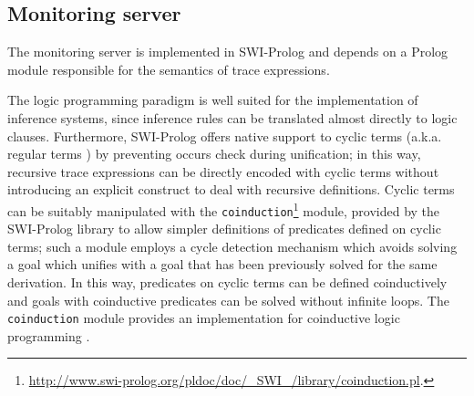 

\subsection*{Monitoring server}

The monitoring server is implemented in SWI-Prolog and depends on a Prolog module responsible for
the semantics of trace expressions.

The logic programming paradigm is well suited for the implementation of inference systems, since inference rules can be translated
almost directly to logic clauses.
Furthermore, SWI-Prolog offers native support to cyclic terms (a.k.a. regular terms \cite{Courcelle83}) by preventing occurs check during unification;
in this way, recursive trace expressions can be directly encoded with cyclic terms without introducing an explicit construct to deal with recursive
definitions.
Cyclic  terms can be suitably manipulated with the \lstinline{coinduction}\footnote{\url{http://www.swi-prolog.org/pldoc/doc/_SWI_/library/coinduction.pl}.}
module, provided by the SWI-Prolog library to allow simpler definitions of predicates defined on cyclic terms;
such a module employs a cycle detection mechanism which avoids solving a goal which unifies with a goal that has been previously solved
for the same derivation. In this way, predicates on cyclic terms can be defined coinductively and goals with coinductive predicates
can be solved without infinite loops. The  \lstinline{coinduction} module provides an implementation for
coinductive logic programming \cite{colp}.



